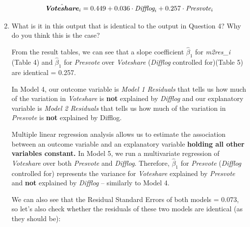 \documentclass[12pt,letterpaper]{article}
\begin{document}
\begin{enumerate}
\begin{flushleft}
		\end{flushleft}
		\[\hat{\textbf{\textit{Voteshare}}}_i  =  0.449 + 0.036\cdot  \textit{Difflog}_i + 0.257\cdot  \textit{Presvote}_i 
		\]
		
		\item What is it in this output that is identical to the output in Question 4? Why do you think this is the case?
	
From the result tables, we can see that a slope coefficient $\hat{\beta}_1$ for \textit{m2res\_i} (Table 4) and $\hat{\beta}_1$ for \textit{Presvote}  over \textit{Voteshare }(\textit{Difflog} controlled for)(Table 5) are identical = 0.257.

In Model 4, our outcome variable is \textit{Model 1 Residuals} that tells us how much of the variation in \textit{Voteshare} is \textbf{not }explained by \textit{Difflog } and our explanatory variable is \textit{Model 2 Residuals} that tells us how much of the variation in \textit{Presvote} is \textbf{not }explained by Difflog. 

Multiple linear regression analysis allows us to estimate the association between an outcome variable and an explanatory variable \textbf{holding all other variables constant. } In Model 5, we run a multivariate regression of \textit{Voteshare} over both \textit{Presvote} and \textit{Difflog}. Therefore, $\hat{\beta}_1$ for \textit{Presvote}  (\textit{Difflog} controlled for) represents the variance for  \textit{Voteshare} explained by \textit{Presvote} and \textbf{not} explained by \textit{Difflog}  -- similarly to Model 4.

We can also see that the Residual Standard Errors of both models = 0.073, so let's also check whether  the residuals of these two models are identical (as they should be):

 


	\end{enumerate}
\end{document}

